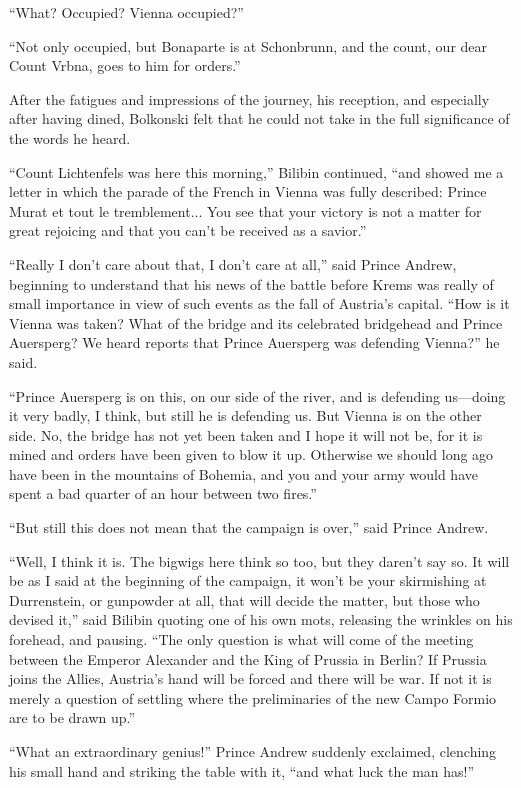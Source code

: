 ``What? Occupied? Vienna occupied?''

``Not only occupied, but Bonaparte is at Schonbrunn, and the
count, our dear Count Vrbna, goes to him for orders.''

After the fatigues and impressions of the journey, his reception,
and especially after having dined, Bolkonski felt that he could
not take in the full significance of the words he heard.

``Count Lichtenfels was here this morning,'' Bilibin continued,
``and showed me a letter in which the parade of the French in
Vienna was fully described: Prince Murat et tout le
tremblement... You see that your victory is not a matter for
great rejoicing and that you can't be received as a savior.''

``Really I don't care about that, I don't care at all,'' said
Prince Andrew, beginning to understand that his news of the
battle before Krems was really of small importance in view of
such events as the fall of Austria's capital. ``How is it Vienna
was taken? What of the bridge and its celebrated bridgehead and
Prince Auersperg? We heard reports that Prince Auersperg was
defending Vienna?'' he said.

``Prince Auersperg is on this, on our side of the river, and is
defending us---doing it very badly, I think, but still he is
defending us. But Vienna is on the other side. No, the bridge has
not yet been taken and I hope it will not be, for it is mined and
orders have been given to blow it up. Otherwise we should long
ago have been in the mountains of Bohemia, and you and your army
would have spent a bad quarter of an hour between two fires.''

``But still this does not mean that the campaign is over,'' said
Prince Andrew.

``Well, I think it is. The bigwigs here think so too, but they
daren't say so. It will be as I said at the beginning of the
campaign, it won't be your skirmishing at Durrenstein, or
gunpowder at all, that will decide the matter, but those who
devised it,'' said Bilibin quoting one of his own mots, releasing
the wrinkles on his forehead, and pausing.  ``The only question
is what will come of the meeting between the Emperor Alexander
and the King of Prussia in Berlin? If Prussia joins the Allies,
Austria's hand will be forced and there will be war. If not it is
merely a question of settling where the preliminaries of the new
Campo Formio are to be drawn up.''

``What an extraordinary genius!'' Prince Andrew suddenly
exclaimed, clenching his small hand and striking the table with
it, ``and what luck the man has!''

